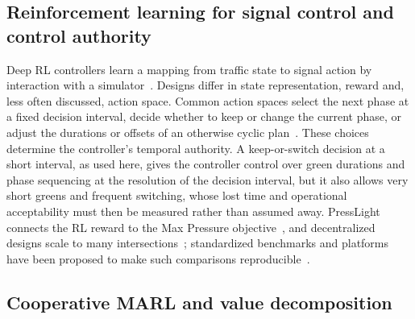 \documentclass[review,12pt]{elsarticle}
\begin{document}
\subsection{Reinforcement learning for signal control and control authority}
\label{subsec:lit_rl}

Deep RL controllers learn a mapping from traffic state to signal action
by interaction with a simulator~\cite{Mnih2015,wei2018intellilight,samaheltantawy2014}.
Designs differ in state representation, reward and, less often
discussed, action space. Common action spaces select the next phase at a
fixed decision interval, decide whether to keep or change the current
phase, or adjust the durations or offsets of an otherwise cyclic
plan~\cite{noaeen2022reinforcement}.
These choices determine the controller's temporal authority. A
keep-or-switch decision at a short interval, as used here, gives the
controller control over green durations and phase sequencing at the
resolution of the decision interval, but it also allows very short
greens and frequent switching, whose lost time and operational
acceptability must then be measured rather than assumed away.
PressLight connects the RL reward to the Max Pressure
objective~\cite{wei2019presslight}, and decentralized designs scale to
many intersections~\cite{chen2020toward}; standardized benchmarks and
platforms have been proposed to make such comparisons
reproducible~\cite{ault2021reinforcement,mei2024libsignal,bokade2025pytsc}.

\subsection{Cooperative MARL and value decomposition}
\label{subsec:lit_marl}
\end{document}

